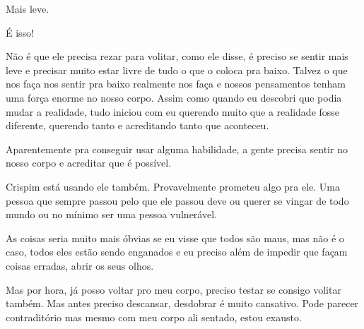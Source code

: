Mais leve.

É isso!

Não é que ele precisa rezar para volitar, como ele disse, é preciso se sentir mais leve e precisar muito estar livre de tudo o que o coloca pra baixo. Talvez o que nos faça nos sentir pra baixo realmente nos faça e nossos pensamentos tenham uma força enorme no nosso corpo. Assim como quando eu descobri que podia mudar a realidade, tudo iniciou com eu querendo muito que a realidade fosse diferente, querendo tanto e acreditando tanto que aconteceu.

Aparentemente pra conseguir usar alguma habilidade, a gente precisa sentir no nosso corpo e acreditar que é possível.

Crispim está usando ele também. Provavelmente prometeu algo pra ele. Uma pessoa que sempre passou pelo que ele passou deve ou querer se vingar de todo mundo ou no mínimo ser uma pessoa vulnerável.

As coisas seria muito mais óbvias se eu visse que todos são maus, mas não é o caso, todos eles estão sendo enganados e eu preciso além de impedir que façam coisas erradas, abrir os seus olhos.

Mas por hora, já posso voltar pro meu corpo, preciso testar se consigo volitar também. Mas antes preciso descansar, desdobrar é muito cansativo. Pode parecer contraditório mas mesmo com meu corpo ali sentado, estou exausto.